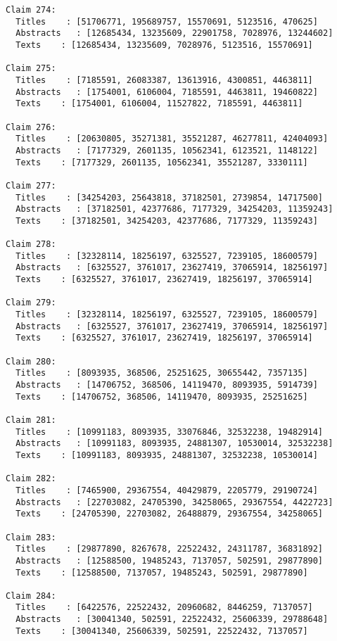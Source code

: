 \documentclass[11pt]{article}
\begin{document}
\begin{Verbatim}[commandchars=\\\{\}]
Claim 274:
  Titles    : [51706771, 195689757, 15570691, 5123516, 470625]
  Abstracts   : [12685434, 13235609, 22901758, 7028976, 13244602]
  Texts    : [12685434, 13235609, 7028976, 5123516, 15570691]

Claim 275:
  Titles    : [7185591, 26083387, 13613916, 4300851, 4463811]
  Abstracts   : [1754001, 6106004, 7185591, 4463811, 19460822]
  Texts    : [1754001, 6106004, 11527822, 7185591, 4463811]

Claim 276:
  Titles    : [20630805, 35271381, 35521287, 46277811, 42404093]
  Abstracts   : [7177329, 2601135, 10562341, 6123521, 1148122]
  Texts    : [7177329, 2601135, 10562341, 35521287, 3330111]

Claim 277:
  Titles    : [34254203, 25643818, 37182501, 2739854, 14717500]
  Abstracts   : [37182501, 42377686, 7177329, 34254203, 11359243]
  Texts    : [37182501, 34254203, 42377686, 7177329, 11359243]

Claim 278:
  Titles    : [32328114, 18256197, 6325527, 7239105, 18600579]
  Abstracts   : [6325527, 3761017, 23627419, 37065914, 18256197]
  Texts    : [6325527, 3761017, 23627419, 18256197, 37065914]

Claim 279:
  Titles    : [32328114, 18256197, 6325527, 7239105, 18600579]
  Abstracts   : [6325527, 3761017, 23627419, 37065914, 18256197]
  Texts    : [6325527, 3761017, 23627419, 18256197, 37065914]

Claim 280:
  Titles    : [8093935, 368506, 25251625, 30655442, 7357135]
  Abstracts   : [14706752, 368506, 14119470, 8093935, 5914739]
  Texts    : [14706752, 368506, 14119470, 8093935, 25251625]

Claim 281:
  Titles    : [10991183, 8093935, 33076846, 32532238, 19482914]
  Abstracts   : [10991183, 8093935, 24881307, 10530014, 32532238]
  Texts    : [10991183, 8093935, 24881307, 32532238, 10530014]

Claim 282:
  Titles    : [7465900, 29367554, 40429879, 2205779, 29190724]
  Abstracts   : [22703082, 24705390, 34258065, 29367554, 4422723]
  Texts    : [24705390, 22703082, 26488879, 29367554, 34258065]

Claim 283:
  Titles    : [29877890, 8267678, 22522432, 24311787, 36831892]
  Abstracts   : [12588500, 19485243, 7137057, 502591, 29877890]
  Texts    : [12588500, 7137057, 19485243, 502591, 29877890]

Claim 284:
  Titles    : [6422576, 22522432, 20960682, 8446259, 7137057]
  Abstracts   : [30041340, 502591, 22522432, 25606339, 29788648]
  Texts    : [30041340, 25606339, 502591, 22522432, 7137057]


\end{Verbatim}
\end{document}
